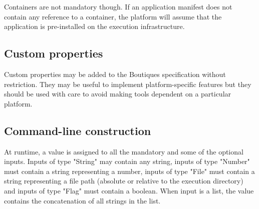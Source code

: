 \documentclass{article}
\begin{document}
Containers are not mandatory though. If an application manifest does
not contain any reference to a container, the platform will assume
that the application is pre-installed on the execution infrastructure. 

\subsection{Custom properties}

Custom properties may be added to the Boutiques specification without
restriction. They may be useful to implement platform-specific
features but they should be used with care to avoid making tools
dependent on a particular platform. 

\subsection{Command-line construction}

At runtime, a value is assigned to all the mandatory and some of the
optional inputs. Inputs of type "String" may contain any string,
inputs of type "Number" must contain a string representing a number,
inputs of type "File" must contain a string representing a file path
(absolute or relative to the execution directory) and inputs of type
"Flag" must contain a boolean. When input is a list, the value
contains the concatenation of all strings in the list.
\end{document}

